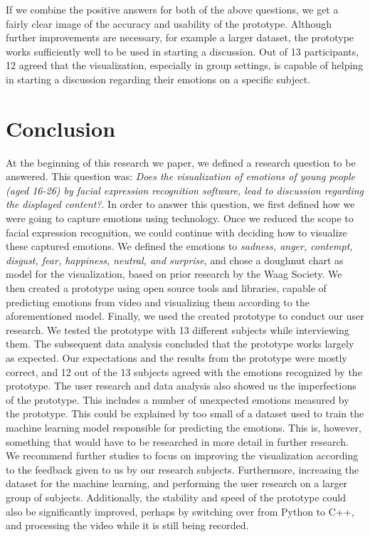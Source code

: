 \documentclass[sigconf]{acmart}
\begin{document}
If we combine the positive answers for both of the above questions, we get a fairly clear image of the accuracy
and usability of the prototype. Although further improvements are necessary, for example a larger dataset,
the prototype works sufficiently well to be used in starting a discussion. Out of 13 participants, 12 agreed that
the visualization, especially in group settings, is capable of helping in starting a discussion regarding their
emotions on a specific subject.


\section{Conclusion}
At the beginning of this research we paper, we defined a research question to be answered. This question was:
\emph{Does the visualization of emotions of young people (aged 16-26) by facial expression recognition software,
lead to discussion regarding the displayed content?}. In order to answer this question, we first defined how
we were going to capture emotions using technology. Once we reduced the scope to facial expression recognition,
we could continue with deciding how to visualize these captured emotions. We defined the emotions to
\emph{sadness, anger, contempt, disgust, fear, happiness, neutral, and surprise}, and chose a doughnut chart
as model for the visualization, based on prior research by the Waag Society. We then created a prototype
using open source tools and libraries, capable of predicting emotions from video and visualizing them according
to the aforementioned model.
Finally, we used the created prototype to conduct our user research. We tested the prototype with 13 different
subjects while interviewing them. The subsequent data analysis concluded that the prototype works largely as
expected. Our expectations and the results from the prototype were mostly correct, and 12 out of the 13 subjects
agreed with the emotions recognized by the prototype. The user research and data analysis also showed us the
imperfections of the prototype. This includes a number of unexpected emotions measured by the prototype.
This could be explained by too small of a dataset used to train the machine learning model responsible for
predicting the emotions. This is, however, something that would have to be researched in more detail in further
research.
We recommend further studies to focus on improving the visualization according to the feedback given to us by
our research subjects. Furthermore, increasing the dataset for the machine learning, and performing the user
research on a larger group of subjects. Additionally, the stability and speed of the prototype could also be
significantly improved, perhaps by switching over from Python to C++, and processing the video while it is still
being recorded.
\end{document}
